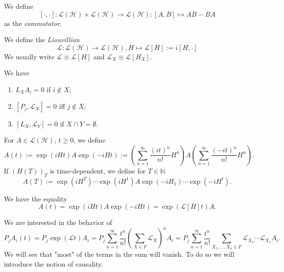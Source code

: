 \begin{defn}[Commutator]
  We define \[[\cdot, \cdot ]: \mathcal{L}(\mathcal{H}) \times \mathcal{L}(\mathcal{H}) \to \mathcal{L}(\mathcal{H}): [A,B] \mapsto AB-BA\] as the \emph{commutator}.
\end{defn}


\begin{defn}[Liouvillian]
  We define the \emph{Liouvillian} \[\mathcal{L}:\mathcal{\mathcal{L}}(\mathcal{H}) \to \mathcal{L}(\mathcal{H}), H \mapsto \mathcal{L}[H]:= i[H, \cdot]\]
  We usually write \(\mathcal{L}\equiv\mathcal{L}[H]\) and \(\mathcal{L}_X\equiv\mathcal{L}[H_X]\).
\end{defn}


\begin{lem}[]
    We have 
    \begin{enumerate}[1)]
      \item \(L_X A_i = 0\) if \(i \notin X\);
      \item \([P_j, \mathcal{L}_X] = 0\) iff \(j \notin X\);
      \item \([L_{X},\mathcal{L}_Y]=0\) if \(X \cap Y = \emptyset \).
    \end{enumerate}
\end{lem}


\begin{defn}
  For \(A \in \mathcal{L}(\mathcal{H})\), \(t \geq 0\), we define 
  \[A(t):= \exp(iHt)A \exp(-iHt):= \left( \sum_{n=1}^{\infty} \frac{(it)^n}{n!} H^n  \right)A \left(\sum_{n=1}^{\infty} \frac{(-it)^{n}}{n!} H^{n}\right). \]
  If \((H(T))_T\) is time-dependent, we define for \(T \in \mathbb{N}\)
  \[A(T):= \exp(iH^{T})\cdots \exp(iH^{1}) A \exp(-iH_{1})\cdots \exp(-iH^{t}).\]
\end{defn}


\begin{lem}[]
    We have the equality
    \[A(t)= \exp(iHt)A \exp(-iHt) = \exp(\mathcal{L}[H]t)A.\]
\end{lem}


\begin{remark}[]
    We are interested in the behavior of \[P_jA_i(t)=P_j\exp(\mathcal{L}t) A_i= P_j\sum_{n=1}^{\infty} \frac{t^{n}}{n!}(\sum_{X\in F}\mathcal{L}_X)^{n}A_i= P_j\sum_{n=1}^{\infty} \frac{t^{n}}{n!} \sum_{X_1,\dots,X_n \in F}^{} \mathcal{L}_{X_n}\cdots \mathcal{L}_{X_1}A_i.\]
We will see that "most" of the terms in the sum will vanish. To do so we will introduce the notion of causality.
\end{remark}


